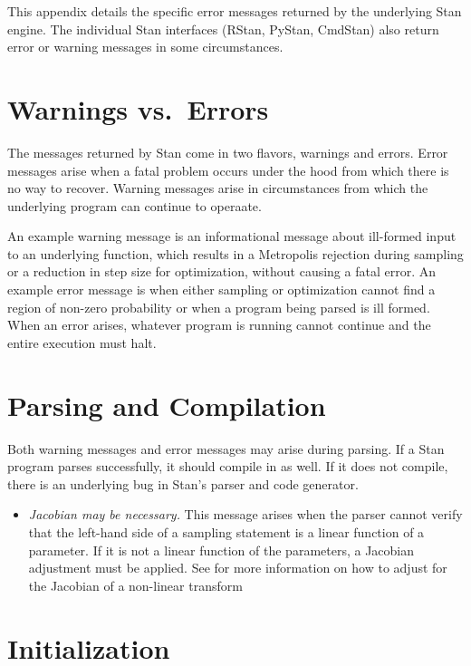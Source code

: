 \noindent
This appendix details the specific error messages returned by the
underlying Stan engine.  The individual Stan interfaces (RStan,
PyStan, CmdStan) also return error or warning messages in some
circumstances.

\section{Warnings vs.\ Errors}

The messages returned by Stan come in two flavors, warnings and
errors.  Error messages arise when a fatal problem occurs under the
hood from which there is no way to recover.  Warning messages arise
in circumstances from which the underlying program can continue to
operaate.

An example warning message is an informational message about
ill-formed input to an underlying function, which results in a
Metropolis rejection during sampling or a reduction in step size for
optimization, without causing a fatal error.  An example error message
is when either sampling or optimization cannot find a region of
non-zero probability or when a program being parsed is ill formed.
When an error arises, whatever program is running cannot continue and
the entire execution must halt.

\section{Parsing and Compilation}

Both warning messages and error messages may arise during parsing.  If
a Stan program parses successfully, it should compile in \Cpp as
well.  If it does not compile, there is an underlying bug in Stan's
parser and \Cpp code generator.

\begin{itemize}
\item {\it Jacobian may be necessary.}  This message arises when the
  parser cannot verify that the left-hand side of a sampling statement
  is a linear function of a parameter.  If it is not a linear function
  of the parameters, a Jacobian adjustment must be applied.  See
   for more information on how to
  adjust for the Jacobian of a non-linear transform
\end{itemize}


\section{Initialization}


